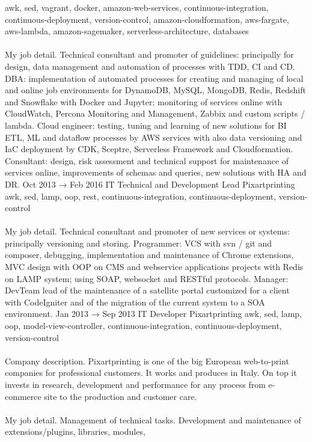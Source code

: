 \documentclass[9pt]{stackoverflow} %
\begin{document}
\begin{tcolorbox}
{\begin{entrylist}
		{{awk, sed, vagrant, docker, amazon-web-services, continuous-integration, continuous-deployment, version-control, amazon-cloudformation, aws-fargate, aws-lambda, amazon-sagemaker, serverless-architecture, databases}\\\\
		My job detail. Technical consultant and promoter of guidelines: principally for design, data management and automation of processes with TDD, CI and CD.
		DBA: implementation of automated processes for creating and managing of local and online job environments for DynamoDB, MySQL, MongoDB, Redis, Redshift and Snowflake with Docker and Jupyter; monitoring of services online with CloudWatch, Percona Monitoring and Management, Zabbix and custom scripts / lambda.
		Cloud engineer: testing, tuning and learning of new solutions for BI ETL, ML and dataflow processes by AWS services with also data versioning and IaC deployment by CDK, Sceptre, Serverless Framework and Cloudformation.
		Consultant: design, risk assessment and technical support for maintenance of services online, improvements of schemas and queries, new solutions with HA and DR.}
	\entry
		{Oct 2013 → Feb 2016}
		{IT Technical and Development Lead}
		{Pixartprinting}
		{{awk, sed, lamp, oop, rest, continuous-integration, continuous-deployment, version-control}\\\\
		My job detail. Technical consultant and promoter of new services or systems: principally versioning and storing. Programmer:
		VCS with svn / git and composer, debugging, implementation and maintenance of Chrome extensions, MVC design with OOP
		on CMS and webservice applications projects with Redis on LAMP system; using SOAP, websocket and RESTful protocols.
		Manager: DevTeam lead of the maintenance of a satellite portal customized for a client with CodeIgniter and of the migration of
		the current system to a SOA environment.}
	\entry
		{Jan 2013 → Sep 2013}
		{IT Developer}
		{Pixartprinting}
		{{awk, sed, lamp, oop, model-view-controller, continuous-integration, continuous-deployment, version-control}\\\\
		Company description. Pixartprinting is one of the big European web-to-print companies for professional customers. It works
		and produces in Italy. On top it invests in research, development and performance for any process from e-commerce site to
		the production and customer care.\\\\
		My job detail. Management of technical tasks. Development and maintenance of extensions/plugins, libraries, modules,
}
\end{entrylist}}
\end{tcolorbox}
\end{document}
